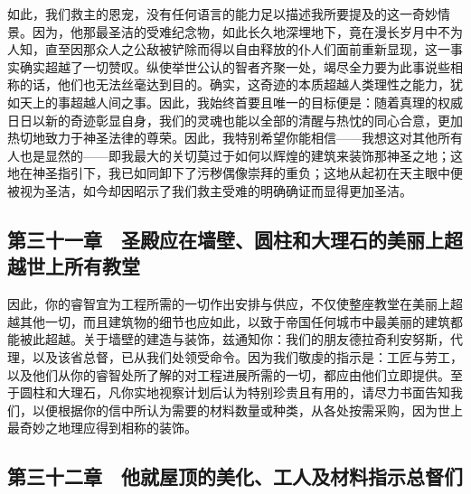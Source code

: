 如此，我们救主的恩宠，没有任何语言的能力足以描述我所要提及的这一奇妙情景。因为，他那最圣洁的受难纪念物，如此长久地深埋地下，竟在漫长岁月中不为人知，直至因那众人之公敌被铲除而得以自由释放的仆人们面前重新显现，这一事实确实超越了一切赞叹。纵使举世公认的智者齐聚一处，竭尽全力要为此事说些相称的话，他们也无法丝毫达到目的。确实，这奇迹的本质超越人类理性之能力，犹如天上的事超越人间之事。因此，我始终首要且唯一的目标便是：随着真理的权威日日以新的奇迹彰显自身，我们的灵魂也能以全部的清醒与热忱的同心合意，更加热切地致力于神圣法律的尊荣。因此，我特别希望你能相信——我想这对其他所有人也是显然的——即我最大的关切莫过于如何以辉煌的建筑来装饰那神圣之地；这地在神圣指引下，我已如同卸下了污秽偶像崇拜的重负；这地从起初在天主眼中便被视为圣洁，如今却因昭示了我们救主受难的明确确证而显得更加圣洁。\par


\subsection{第三十一章　圣殿应在墙壁、圆柱和大理石的美丽上超越世上所有教堂}

因此，你的睿智宜为工程所需的一切作出安排与供应，不仅使整座教堂在美丽上超越其他一切，而且建筑物的细节也应如此，以致于帝国任何城市中最美丽的建筑都能被此超越。关于墙壁的建造与装饰，兹通知你：我们的朋友德拉奇利安努斯，代理，以及该省总督，已从我们处领受命令。因为我们敬虔的指示是：工匠与劳工，以及他们从你的睿智处所了解的对工程进展所需的一切，都应由他们立即提供。至于圆柱和大理石，凡你实地视察计划后认为特别珍贵且有用的，请尽力书面告知我们，以便根据你的信中所认为需要的材料数量或种类，从各处按需采购，因为世上最奇妙之地理应得到相称的装饰。\par


\subsection{第三十二章　他就屋顶的美化、工人及材料指示总督们}

\par

